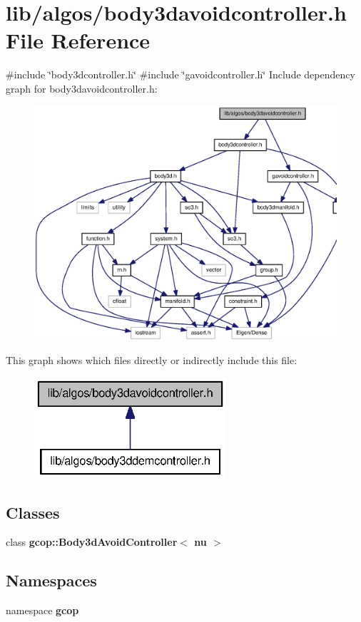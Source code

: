 \section{lib/algos/body3davoidcontroller.h \-File \-Reference}
\label{body3davoidcontroller_8h}
{\ttfamily \#include \char`\"{}body3dcontroller.\-h\char`\"{}}\*
{\ttfamily \#include \char`\"{}gavoidcontroller.\-h\char`\"{}}\*
\-Include dependency graph for body3davoidcontroller.\-h\-:
\nopagebreak
\begin{figure}[H]
\begin{center}
\leavevmode
\includegraphics[width=350pt]{body3davoidcontroller_8h__incl}
\end{center}
\end{figure}
\-This graph shows which files directly or indirectly include this file\-:
\nopagebreak
\begin{figure}[H]
\begin{center}
\leavevmode
\includegraphics[width=202pt]{body3davoidcontroller_8h__dep__incl}
\end{center}
\end{figure}
\subsection*{\-Classes}
\begin{DoxyCompactItemize}
\item 
class {\bf gcop\-::\-Body3d\-Avoid\-Controller$<$ nu $>$}
\end{DoxyCompactItemize}
\subsection*{\-Namespaces}
\begin{DoxyCompactItemize}
\item 
namespace {\bf gcop}
\end{DoxyCompactItemize}
